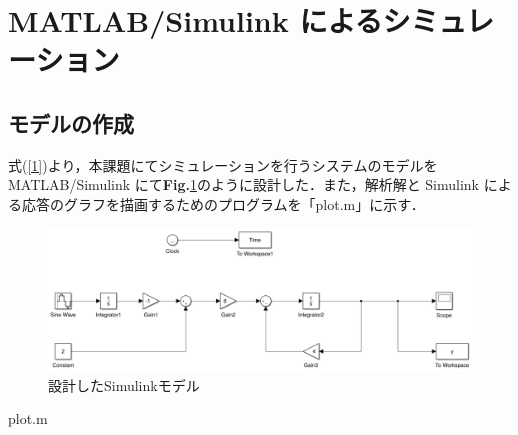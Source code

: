 \documentclass[a4paper,12pt]{jarticle}
\begin{document}
\section{MATLAB/Simulink によるシミュレーション}
\subsection{モデルの作成}
式(\ref{1})より，本課題にてシミュレーションを行うシステムのモデルを MATLAB/Simulink にて{\bf Fig.}{\ref{model}}のように設計した．また，解析解と Simulink による応答のグラフを描画するためのプログラムを「plot.m」に示す．
\begin{figure}[tb]
 \begin{center}
  \includegraphics[scale=0.9]{../figure/eps/model2.eps}
  \caption{設計したSimulinkモデル}
  \label{model}
 \end{center}
\end{figure}
%   
\begin{itembox}[l]{plot.m}
 {\scriptsize
 
}
\end{itembox}

%
\end{document}

